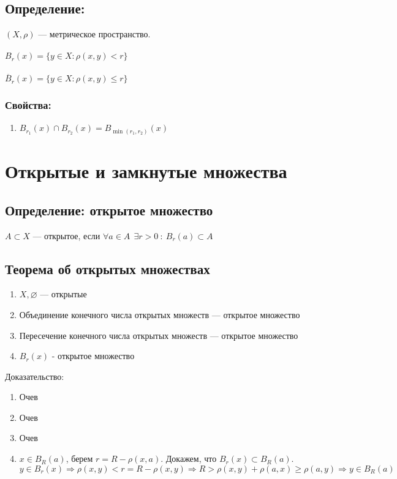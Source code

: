 \documentclass[12pt]{report} %
\begin{document}
\subsection*{Определение:}
$(X, \rho)$ --- метрическое пространство. \\ \\
$B_r(x) = \{y \in X : \rho(x, y) < r\}$ \\ \\
$\overline{B}_r(x) = \{y \in X : \rho(x, y) \leqslant r\}$
\subsubsection*{Свойства:}

\begin{enumerate}
\item $B_{r_1}(x) \cap B_{r_2}(x) = B_{\min(r_1, r_2)}(x)$
\end{enumerate}

\section*{Открытые и замкнутые множества}


\subsection*{Определение: открытое множество}
$A \subset X$ --- открытое, если $\forall a \in A \ \ \exists r > 0 \ : \ B_r(a) \subset A$
\subsection*{Теорема об открытых множествах}
\begin{enumerate}
\item $X, \varnothing$ --- открытые
\item Объединение конечного числа открытых множеств --- открытое множество
\item Пересечение конечного числа открытых множеств --- открытое множество
\item $B_r(x)$ - открытое множество
\end{enumerate}

Доказательство:\\
\begin{enumerate}
\item Очев
\item Очев
\item Очев
\item $x \in B_R(a)$, берем $r = R - \rho(x, a)$. Докажем, что $B_r(x) \subset B_R(a)$. $y \in B_r(x) \Rightarrow \rho(x, y) < r = R - \rho(x, y) \Rightarrow R > \rho(x, y) + \rho(a, x) \geqslant \rho(a, y) \Rightarrow y \in B_R(a)$ 
\end{enumerate}
\end{document}

